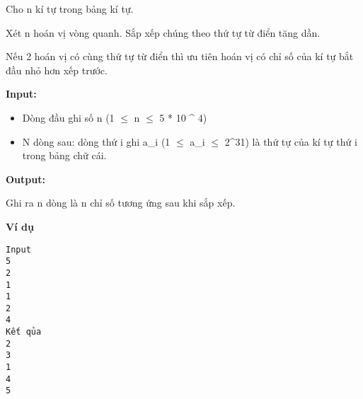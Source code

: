 

Cho n kí tự trong bảng kí tự.

Xét n hoán vị vòng quanh. Sắp xếp chúng theo thứ tự từ điển tăng dần.

Nếu 2 hoán vị có cùng thứ tự từ điển thì ưu tiên hoán vị có chỉ số của kí tự bắt đầu nhỏ hơn xếp trước.

\textbf{Input:}
\begin{itemize}
	\item Dòng đầu ghi số n (1 $\le$  n  $\le$  5 * 10 ^ 4)
	\item N dòng sau: dòng thứ i ghi a\_i (1  $\le$  a\_i  $\le$  2^31) là thứ tự của kí tự thứ i trong bảng chữ cái.
\end{itemize}

\textbf{Output:}

Ghi ra n dòng là n chỉ số tương ứng sau khi sắp xếp.

\textbf{Ví dụ}
\begin{verbatim}
Input
5
2
1
1
2
4
Kết qủa
2
3
1
4
5\end{verbatim}

